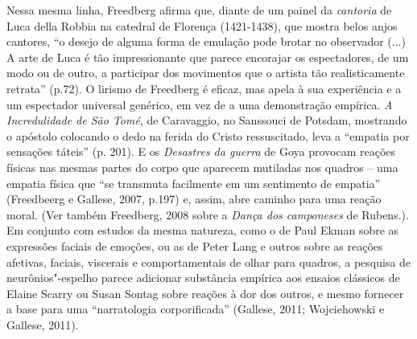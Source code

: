 Nessa mesma linha, Freedberg afirma que, diante de um painel da
\emph{cantoria} de Luca della Robbia na catedral de Florença
(1421-1438), que mostra belos anjos cantores, ``o desejo de alguma forma
de emulação pode brotar no observador (...) A arte de Luca é tão
impressionante que parece encorajar os espectadores, de um modo ou de
outro, a participar dos movimentos que o artista tão realisticamente
retrata'' (p.72). O lirismo de Freedberg é eficaz, mas apela à sua
experiência e a um espectador universal genérico, em vez de a uma
demonstração empírica. \emph{A Incredulidade de São Tomé}, de
Caravaggio, no Sanssouci de Potsdam, mostrando o apóstolo colocando o
dedo na ferida do Cristo ressuscitado, leva a ``empatia por sensações
táteis'' (p. 201). E os \emph{Desastres da guerra} de Goya provocam
reações físicas nas mesmas partes do corpo que aparecem mutiladas nos
quadros -- uma empatia física que ``se transmuta facilmente em um
sentimento de empatia'' (Freedbeerg e Gallese, 2007, p.197) e, assim,
abre caminho para uma reação moral. (Ver também Freedberg, 2008 sobre a
\emph{Dança dos camponeses} de Rubens.). Em conjunto com estudos da
mesma natureza, como o de Paul Ekman sobre as expressões faciais de
emoções, ou as de Peter Lang e outros sobre as reações afetivas,
faciais, viscerais e comportamentais de olhar para quadros, a pesquisa
de neurônios"-espelho parece adicionar substância empírica aos ensaios
clássicos de Elaine Scarry ou Susan Sontag sobre reações à dor dos
outros, e mesmo fornecer a base para uma ``narratologia corporificada''
(Gallese, 2011; Wojciehowski e Gallese, 2011).

